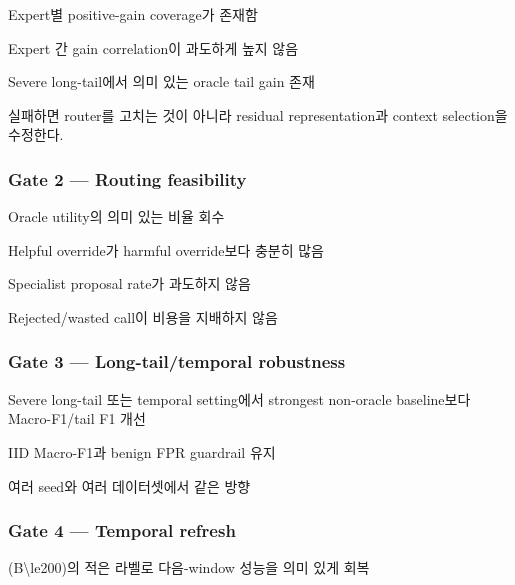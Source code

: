 \par\noindent \textbullet\enspace Expert별 positive-gain coverage가 존재함


\par\noindent \textbullet\enspace Expert 간 gain correlation이 과도하게 높지 않음


\par\noindent \textbullet\enspace Severe long-tail에서 의미 있는 oracle tail gain 존재


실패하면 router를 고치는 것이 아니라 residual representation과 context selection을 수정한다.

\subsubsection{Gate 2 — Routing feasibility}
\par\noindent \textbullet\enspace Oracle utility의 의미 있는 비율 회수


\par\noindent \textbullet\enspace Helpful override가 harmful override보다 충분히 많음


\par\noindent \textbullet\enspace Specialist proposal rate가 과도하지 않음


\par\noindent \textbullet\enspace Rejected/\allowbreak{}wasted call이 비용을 지배하지 않음


\subsubsection{Gate 3 — Long-tail/\allowbreak{}temporal robustness}
\par\noindent \textbullet\enspace Severe long-tail 또는 temporal setting에서 strongest non-oracle baseline보다 Macro-F1/\allowbreak{}tail F1 개선


\par\noindent \textbullet\enspace IID Macro-F1과 benign FPR guardrail 유지


\par\noindent \textbullet\enspace 여러 seed와 여러 데이터셋에서 같은 방향


\subsubsection{Gate 4 — Temporal refresh}
\par\noindent \textbullet\enspace (B\textbackslash{}le200)의 적은 라벨로 다음-window 성능을 의미 있게 회복


